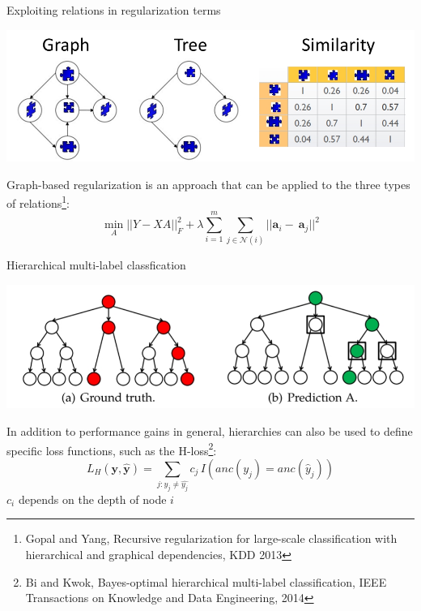 \documentclass[]{beamer}
\renewcommand{\vec}[1]{\boldsymbol{#1}}
\begin{document}
\begin{frame}{Exploiting relations in regularization terms}

\begin{center}
\includegraphics[width=\textwidth]{pics/targetrelations}
\end{center} \pause 

Graph-based regularization is an approach that can be applied to the three types of relations\footnote{Gopal and Yang, Recursive regularization for large-scale classification with hierarchical
and graphical dependencies, KDD 2013}: 
\begin{equation*}
\min_A ||Y - XA ||^2_F + \lambda \sum_{i=1}^m \sum_{j \in \mathcal{N}(i)} ||\vec{a}_i - \ \vec{a}_j||^2 
\end{equation*}

\end{frame}

\begin{frame}{Hierarchical multi-label classfication}

\vspace{-0.2cm}
\begin{center}
\includegraphics[width=\textwidth]{Figures/hloss}
\end{center}

\vspace{-0.2cm}
In addition to performance gains in general, hierarchies can also be used to define specific loss functions, such as the H-loss\footnote{Bi and Kwok, Bayes-optimal hierarchical multi-label classification, IEEE Transactions on Knowledge and Data Engineering, 2014}: 
$$L_H(\vec{y},\hat{\vec{y}}) = \sum_{j: y_j \neq \hat{y_j}} c_j \, I(\textit{anc}(y_j) = \textit{anc}(\hat{y}_j))$$
$c_i$ depends on the depth of node $i$
\end{frame}
\end{document}
